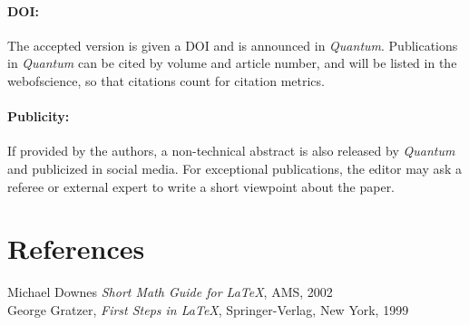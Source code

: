 \documentclass[12pt]{quantumarticle}
\begin{document}
\paragraph{DOI:} The accepted version is given a DOI and is announced in \textit{Quantum}. Publications in \textit{Quantum} can be cited by volume and article number, and will be listed in the webofscience, so that citations count for citation metrics.

\paragraph{Publicity:} If provided by the authors, a non-technical abstract is also released by \textit{Quantum} and publicized in social media. For exceptional publications, the editor may ask a referee or external expert to write a short viewpoint about the paper.





\section{References}
Michael Downes \emph{Short Math Guide for \LaTeX}, AMS, 2002\\[0.2in]
George Gratzer, \emph{First Steps in \LaTeX}, Springer-Verlag, New York, 1999\\[0.2in]
\end{document}
